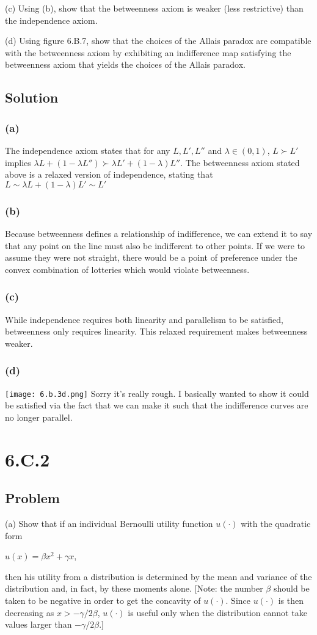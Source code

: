 \documentclass[10pt, a4paper]{article}
\begin{document}
    (c) Using (b), show that the betweenness axiom is weaker (less restrictive) than the independence axiom.

    (d) Using figure 6.B.7, show that the choices of the Allais paradox are compatible with the betweenness axiom by exhibiting an indifference map satisfying the betweenness axiom that yields the choices of the Allais paradox.
    \subsection*{Solution}
      \subsubsection*{(a)}
        The independence axiom states that for any $L,L',L''$ and $\lambda\in(0,1)$, $L\succ L'$ implies $\lambda L+(1-\lambda L'')\succ \lambda L'+(1-\lambda)L''$. The betweenness axiom stated above is a relaxed version of independence, stating that $L\sim\lambda L+(1-\lambda)L'\sim L'$ 
      \subsubsection*{(b)}
        Because betweenness defines a relationship of indifference, we can extend it to say that any point on the line must also be indifferent to other points. If we were to assume they were not straight, there would be a point of preference under the convex combination of lotteries which would violate betweenness. 
      \subsubsection*{(c)}
        While independence requires both linearity and parallelism to be satisfied, betweenness only requires linearity. This relaxed requirement makes betweenness weaker.
      \subsubsection*{(d)}
        \texttt{[image: 6.b.3d.png]}
        Sorry it's really rough. I basically wanted to show it could be satisfied via the fact that we can make it such that the indifference curves are no longer parallel.
  \section*{6.C.2}
    \subsection*{Problem}
      (a) Show that if an individual Bernoulli utility function $u(\cdot)$ with the quadratic form
      \begin{center}
        $u(x) = \beta x^2+\gamma x$,
      \end{center}
      then his utility from a distribution is determined by the mean and variance of the distribution and, in fact, by these moments alone. [Note: the number $\beta$ should be taken to be negative in order to get the concavity of $u(\cdot)$. Since $u(\cdot)$ is then decreasing as $x>-\gamma/2\beta$, $u(\cdot)$ is useful only when the distribution cannot take values larger than $-\gamma/2\beta$.] 
\end{document}

